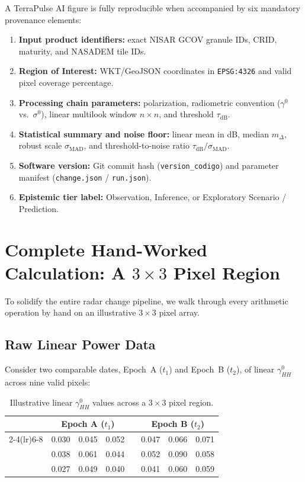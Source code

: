 \documentclass[11pt,a4paper]{article}
\begin{document}
A TerraPulse AI figure is fully reproducible when accompanied by six mandatory provenance elements:
\begin{enumerate}
  \item \textbf{Input product identifiers:} exact NISAR GCOV granule IDs, CRID, maturity, and NASADEM tile IDs.
  \item \textbf{Region of Interest:} WKT/GeoJSON coordinates in \texttt{EPSG:4326} and valid pixel coverage percentage.
  \item \textbf{Processing chain parameters:} polarization, radiometric convention ($\gamma^0$ vs.\ $\sigma^0$), linear multilook window $n\times n$, and threshold $\tau_{\mathrm{dB}}$.
  \item \textbf{Statistical summary and noise floor:} linear mean in dB, median $m_\Delta$, robust scale $\sigma_{\mathrm{MAD}}$, and threshold-to-noise ratio $\tau_{\mathrm{dB}}/\sigma_{\mathrm{MAD}}$.
  \item \textbf{Software version:} Git commit hash (\texttt{version\_codigo}) and parameter manifest (\texttt{change.json} / \texttt{run.json}).
  \item \textbf{Epistemic tier label:} Observation, Inference, or Exploratory Scenario / Prediction.
\end{enumerate}


\section{Complete Hand-Worked Calculation: A $3\times3$ Pixel Region}
\label{sec:mano}

To solidify the entire radar change pipeline, we walk through every arithmetic operation by hand on an illustrative $3\times3$ pixel array.

\subsection{Raw Linear Power Data}

Consider two comparable dates, Epoch~A ($t_1$) and Epoch~B ($t_2$), of linear $\gamma^0_{HH}$ across nine valid pixels:

\begin{table}[htbp]
\centering
\caption{Illustrative linear $\gamma^0_{HH}$ values across a $3\times3$ pixel region.}
\label{tab:mano-lineal}
\small
\begin{tabular}{@{}c ccc c ccc@{}}
\toprule
 & \multicolumn{3}{c}{Epoch A ($t_1$)} & & \multicolumn{3}{c}{Epoch B ($t_2$)} \\
\cmidrule(lr){2-4}\cmidrule(lr){6-8}
 & 0.030 & 0.045 & 0.052 & & 0.047 & 0.066 & 0.071 \\
 & 0.038 & 0.061 & 0.044 & & 0.052 & 0.090 & 0.058 \\
 & 0.027 & 0.049 & 0.040 & & 0.041 & 0.060 & 0.059 \\
\bottomrule
\end{tabular}
\end{table}
\end{document}
